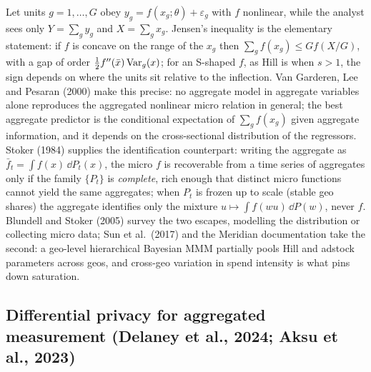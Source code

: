 Let units $g = 1,\ldots,G$ obey $y_g = f(x_g;\theta) + \varepsilon_g$ with $f$ nonlinear, while the analyst sees only $Y = \sum_g y_g$ and $X = \sum_g x_g$. Jensen's inequality is the elementary statement: if $f$ is concave on the range of the $x_g$ then $\sum_g f(x_g) \le G f(X/G)$, with a gap of order $\tfrac12 f''(\bar x)\operatorname{Var}_g(x)$; for an S-shaped $f$, as Hill is when $s > 1$, the sign depends on where the units sit relative to the inflection. Van Garderen, Lee and Pesaran (2000) make this precise: no aggregate model in aggregate variables alone reproduces the aggregated nonlinear micro relation in general; the best aggregate predictor is the conditional expectation of $\sum_g f(x_g)$ given aggregate information, and it depends on the cross-sectional distribution of the regressors. Stoker (1984) supplies the identification counterpart: writing the aggregate as $\bar f_t = \int f(x)\,\dd P_t(x)$, the micro $f$ is recoverable from a time series of aggregates only if the family $\{P_t\}$ is \emph{complete}, rich enough that distinct micro functions cannot yield the same aggregates; when $P_t$ is frozen up to scale (stable geo shares) the aggregate identifies only the mixture $u \mapsto \int f(wu)\,\dd P(w)$, never $f$. Blundell and Stoker (2005) survey the two escapes, modelling the distribution or collecting micro data; Sun et al.\ (2017) and the Meridian documentation take the second: a geo-level hierarchical Bayesian MMM partially pools Hill and adstock parameters across geos, and cross-geo variation in spend intensity is what pins down saturation.

\subsection{Differential privacy for aggregated measurement (Delaney et al., 2024; Aksu et al., 2023)}

